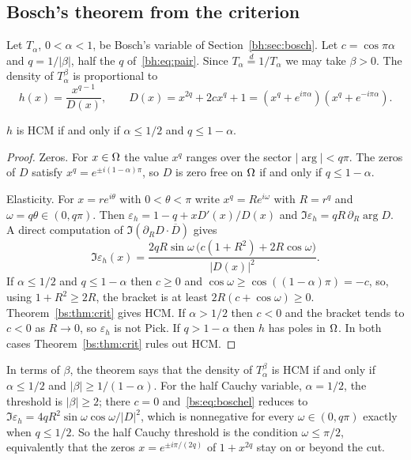 \subsection{Bosch's theorem from the criterion}\label{bs:sec:bosch}

Let $T_\alpha$, $0<\alpha<1$, be Bosch's variable of Section~\ref{bh:sec:bosch}. Let $c=\cos\pi\alpha$ and $q=1/|\beta|$, half the $q$ of~\eqref{bh:eq:pair}. Since $T_\alpha\stackrel{d}{=}1/T_\alpha$ we may take $\beta>0$. The density of $T_\alpha^\beta$ is proportional to
\[
h(x)=\frac{x^{q-1}}{D(x)},\qquad D(x)=x^{2q}+2cx^q+1=(x^q+e^{i\pi\alpha})(x^q+e^{-i\pi\alpha}).
\]

\begin{theorem}\label{bs:thm:bosch}
$h$ is HCM if and only if $\alpha\le1/2$ and $q\le1-\alpha$.
\end{theorem}

\begin{proof}
Zeros. For $x\in\Omega$ the value $x^q$ ranges over the sector $|\arg|<q\pi$. The zeros of $D$ satisfy $x^q=e^{\pm i(1-\alpha)\pi}$, so $D$ is zero free on $\Omega$ if and only if $q\le1-\alpha$.

Elasticity. For $x=re^{i\theta}$ with $0<\theta<\pi$ write $x^q=Re^{i\omega}$ with $R=r^q$ and $\omega=q\theta\in(0,q\pi)$. Then $\varepsilon_h=1-q+xD'(x)/D(x)$ and $\Im\varepsilon_h=qR\,\partial_R\arg D$. A direct computation of $\Im(\partial_RD\cdot\overline D)$ gives
\begin{equation}\label{bs:eq:boschel}
\Im\varepsilon_h(x)=\frac{2qR\sin\omega\,\bigl(c(1+R^2)+2R\cos\omega\bigr)}{|D(x)|^2}.
\end{equation}
If $\alpha\le1/2$ and $q\le1-\alpha$ then $c\ge0$ and $\cos\omega\ge\cos((1-\alpha)\pi)=-c$, so, using $1+R^2\ge2R$, the bracket is at least $2R(c+\cos\omega)\ge0$. Theorem~\ref{bs:thm:crit} gives HCM. If $\alpha>1/2$ then $c<0$ and the bracket tends to $c<0$ as $R\to0$, so $\varepsilon_h$ is not Pick. If $q>1-\alpha$ then $h$ has poles in $\Omega$. In both cases Theorem~\ref{bs:thm:crit} rules out HCM.
\end{proof}

In terms of $\beta$, the theorem says that the density of $T_\alpha^\beta$ is HCM if and only if $\alpha\le1/2$ and $|\beta|\ge1/(1-\alpha)$. For the half Cauchy variable, $\alpha=1/2$, the threshold is $|\beta|\ge2$; there $c=0$ and~\eqref{bs:eq:boschel} reduces to $\Im\varepsilon_h=4qR^2\sin\omega\cos\omega/|D|^2$, which is nonnegative for every $\omega\in(0,q\pi)$ exactly when $q\le1/2$. So the half Cauchy threshold is the condition $\omega\le\pi/2$, equivalently that the zeros $x=e^{\pm i\pi/(2q)}$ of $1+x^{2q}$ stay on or beyond the cut.

